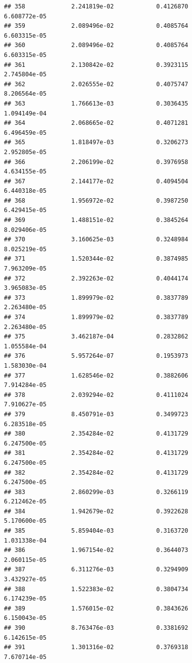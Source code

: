 \documentclass[
]{article}
\begin{document}
\begin{verbatim}
## 358             2.241819e-02            0.4126870            6.608772e-05
## 359             2.089496e-02            0.4085764            6.603315e-05
## 360             2.089496e-02            0.4085764            6.603315e-05
## 361             2.130842e-02            0.3923115            2.745804e-05
## 362             2.026555e-02            0.4075747            8.206564e-05
## 363             1.766613e-03            0.3036435            1.094149e-04
## 364             2.068665e-02            0.4071281            6.496459e-05
## 365             1.818497e-03            0.3206273            2.952805e-05
## 366             2.206199e-02            0.3976958            4.634155e-05
## 367             2.144177e-02            0.4094504            6.440318e-05
## 368             1.956972e-02            0.3987250            6.429415e-05
## 369             1.488151e-02            0.3845264            8.029406e-05
## 370             3.160625e-03            0.3248984            8.025219e-05
## 371             1.520344e-02            0.3874985            7.963209e-05
## 372             2.392263e-02            0.4044174            3.965083e-05
## 373             1.899979e-02            0.3837789            2.263480e-05
## 374             1.899979e-02            0.3837789            2.263480e-05
## 375             3.462187e-04            0.2832862            1.055584e-04
## 376             5.957264e-07            0.1953973            1.583030e-04
## 377             1.628546e-02            0.3882606            7.914284e-05
## 378             2.039294e-02            0.4111024            7.910627e-05
## 379             8.450791e-03            0.3499723            6.283518e-05
## 380             2.354284e-02            0.4131729            6.247500e-05
## 381             2.354284e-02            0.4131729            6.247500e-05
## 382             2.354284e-02            0.4131729            6.247500e-05
## 383             2.860299e-03            0.3266119            6.212462e-05
## 384             1.942679e-02            0.3922628            5.170600e-05
## 385             5.859404e-03            0.3163720            1.031338e-04
## 386             1.967154e-02            0.3644073            2.060115e-05
## 387             6.311276e-03            0.3294909            3.432927e-05
## 388             1.522383e-02            0.3804734            6.174239e-05
## 389             1.576015e-02            0.3843626            6.150043e-05
## 390             8.763476e-03            0.3381692            6.142615e-05
## 391             1.301316e-02            0.3769318            7.670714e-05

\end{verbatim}
\end{document}
